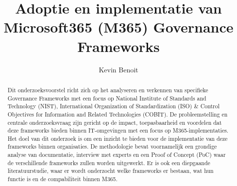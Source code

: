 \documentclass{hogent-article}
\title{Adoptie en implementatie van Microsoft365 (M365) Governance Frameworks}
\author{Kevin Benoit}
\begin{document}
\begin{abstract}
Dit onderzoeksvoorstel richt zich op het analyseren en verkennen van specifieke Governance Frameworks met een focus op National Institute of Standards and Technology (NIST), International Organization of Standardization (ISO) \& Control Objectives for Information and Related Technologies (COBIT). De probleemstelling en centrale onderzoeksvraag zijn gericht op de impact, toepasbaarheid en voordelen dat deze frameworks bieden binnen IT-omgevingen met een focus op M365-implementaties. Het doel van dit onderzoek is om een inzicht te bieden voor de implementatie van deze frameworks binnen organisaties.  De methodologie bevat voornamelijk een grondige analyse van documentatie, interview met experts en een Proof of Concept (PoC) waar de verschillende frameworks zullen worden uitgewerkt. Er is ook een diepgaande literatuurstudie, waar er wordt onderzocht welke frameworks er bestaan, wat hun functie is en de compabiliteit binnen M365. 

\end{abstract}

\tableofcontents



\printbibliography[heading=bibintoc]
\end{document}
